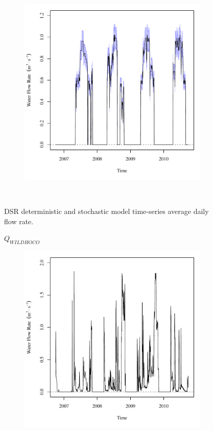 \begin{linenumbers}
\begin{landscape}
\begin{figure}
\begin{subfigure}{0.7\textwidth}
			\includegraphics[width=\tableCustomSize]{"Figures/Results_DSR/Stochastic/Q FRO"}
		\end{subfigure}\\
		\caption{DSR deterministic and stochastic model time-series average daily flow rate.}
	\end{figure}
\end{landscape}
\subfiguremid
\begin{landscape}
	\begin{figure}
		\centering
		$ Q_{WILDHOCO} $
		\begin{subfigure}{0.7\textwidth}
			\centering
			\includegraphics[width=\tableCustomSize]{"Figures/Results_DSR/Deterministic/Q WIL"}

\end{subfigure}
\end{figure}
\end{landscape}
\end{linenumbers}

